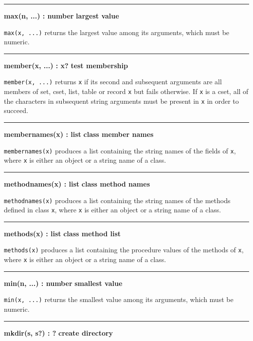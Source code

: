 \bigskip\hrule\vspace{0.1cm}
\noindent
{\bf max(n, ...) : number } \hfill {\bf largest value}

\noindent
{}\texttt{max(x, ...)} returns the largest value among its
arguments, which must be numeric.

\bigskip\hrule\vspace{0.1cm}
\noindent
{\bf member(x, ...) : x? } \hfill {\bf test membership}

\noindent
{}\texttt{member(x, ...)} returns \texttt{x} if its second
and subsequent arguments are all members of set, cset, list, table or record
\texttt{x} but fails otherwise. If \texttt{x} is a cset, all of the
characters in subsequent string arguments must be present in \texttt{x}
in order to succeed.

\bigskip\hrule\vspace{0.1cm}
\noindent
{\bf membernames(x) : list } \hfill {\bf class member names}

\noindent
\texttt{membernames(x)} produces a list containing the string names of
the fields of \texttt{x}, where \texttt{x} is either an object or a
string name of a class.

\bigskip\hrule\vspace{0.1cm}
\noindent
{\bf methodnames(x) : list } \hfill {\bf class method names}

\noindent
\texttt{methodnames(x)} produces a list containing the string names of
the methods defined in class \texttt{x}, where \texttt{x} is either an
object or a string name of a class.

\bigskip\hrule\vspace{0.1cm}
\noindent
{\bf methods(x) : list } \hfill {\bf class method list}

\noindent
\texttt{methods(x)} produces a list containing the procedure values of
the methods of \texttt{x}, where \texttt{x} is either an object or a
string name of a class.

\bigskip\hrule\vspace{0.1cm}
\noindent
{\bf min(n, ...) : number } \hfill {\bf smallest value}

\noindent
{}\texttt{min(x, ...)} returns the smallest value among its
arguments, which must be numeric.

\bigskip\hrule\vspace{0.1cm}
\noindent
{\bf mkdir(s, s?) : ? } \hfill {\bf create directory}

